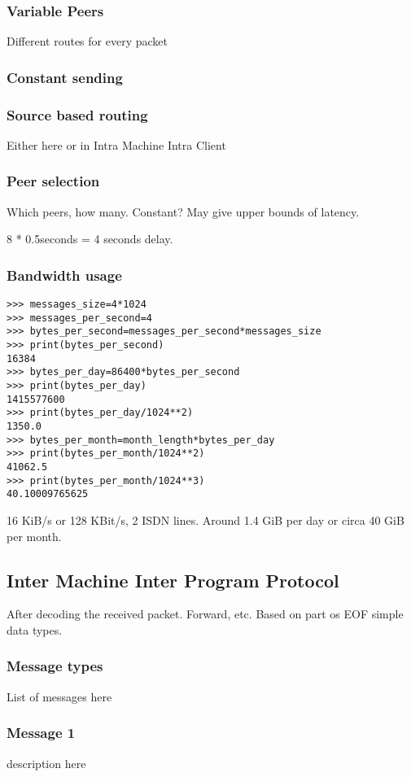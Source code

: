 \subsubsection{Variable Peers}
Different routes for every packet
\subsubsection{Constant sending}

\subsubsection{Source based routing}
Either here or in Intra Machine Intra Client
\subsubsection{Peer selection}
Which peers, how many. Constant? May give upper bounds of latency.

8 * 0.5seconds = 4 seconds delay.

\subsubsection{Bandwidth usage}
\begin{verbatim}
>>> messages_size=4*1024
>>> messages_per_second=4
>>> bytes_per_second=messages_per_second*messages_size
>>> print(bytes_per_second)
16384
>>> bytes_per_day=86400*bytes_per_second
>>> print(bytes_per_day)
1415577600
>>> print(bytes_per_day/1024**2)
1350.0
>>> bytes_per_month=month_length*bytes_per_day
>>> print(bytes_per_month/1024**2)
41062.5
>>> print(bytes_per_month/1024**3)
40.10009765625
\end{verbatim}
16 KiB/s or 128 KBit/s, 2 ISDN lines. Around 1.4 GiB per day or
circa 40 GiB per month.

\subsection{Inter Machine Inter Program Protocol}
After decoding the received packet. Forward, etc.
Based on part os EOF simple data types.
\subsubsection{Message types}
List of messages here
\subsubsection{Message 1}
description here


